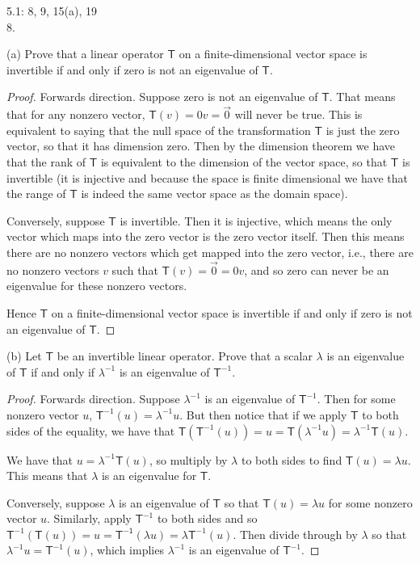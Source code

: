 \documentclass[11pt]{article}
\begin{document}
5.1: 8, 9, 15(a), 19 \\

8. 

(a) Prove that a linear operator $\mathsf{T}$ on a finite-dimensional vector space is invertible if and only if zero is not an eigenvalue of $\mathsf{T}$.

\begin{proof}
  Forwards direction. Suppose zero is not an eigenvalue of $\mathsf{T}$. That means that for any nonzero vector, $\mathsf{T}(v) = 0v = \vec{0}$ will never be true. This is equivalent to saying that the null space of the transformation $\mathsf{T}$ is just the zero vector, so that it has dimension zero. Then by the dimension theorem we have that the rank of $\mathsf{T}$ is equivalent to the dimension of the vector space, so that $\mathsf{T}$ is invertible (it is injective and because the space is finite dimensional we have that the range of $\mathsf{T}$ is indeed the same vector space as the domain space). 

  Conversely, suppose $\mathsf{T}$ is invertible. Then it is injective, which means the only vector which maps into the zero vector is the zero vector itself. Then this means there are no nonzero vectors which get mapped into the zero vector, i.e., there are no nonzero vectors $v$ such that $\mathsf{T}(v) = \vec{0} = 0v$, and so zero can never be an eigenvalue for these nonzero vectors.

  Hence $\mathsf{T}$ on a finite-dimensional vector space is invertible if and only if zero is not an eigenvalue of $\mathsf{T}$.
\end{proof}

(b) Let $\mathsf{T}$ be an invertible linear operator. Prove that a scalar $\lambda$ is an eigenvalue of $\mathsf{T}$ if and only if $\lambda^{-1}$ is an eigenvalue of $\mathsf{T}^{-1}$.

\begin{proof}
  Forwards direction. Suppose $\lambda^{-1}$ is an eigenvalue of $\mathsf{T}^{-1}$. Then for some nonzero vector $u$, $\mathsf{T}^{-1}(u) = \lambda^{-1}u$. But then notice that if we apply $\mathsf{T}$ to both sides of the equality, we have that $\mathsf{T}(\mathsf{T}^{-1}(u)) = u = \mathsf{T}(\lambda^{-1}u) = \lambda^{-1}\mathsf{T}(u)$.

  We have that $u = \lambda^{-1}\mathsf{T}(u)$, so multiply by $\lambda$ to both sides to find $\mathsf{T}(u) = \lambda u$. This means that $\lambda$ is an eigenvalue for $\mathsf{T}$.

  Conversely, suppose $\lambda$ is an eigenvalue of $\mathsf{T}$ so that $\mathsf{T}(u) = \lambda u$ for some nonzero vector $u$. Similarly, apply $\mathsf{T}^{-1}$ to both sides and so $\mathsf{T}^{-1}(\mathsf{T}(u)) = u = \mathsf{T^{-1}}(\lambda u) = \lambda \mathsf{T}^{-1}(u)$. Then divide through by $\lambda$ so that $\lambda^{-1}u = \mathsf{T}^{-1}(u)$, which implies $\lambda^{-1}$ is an eigenvalue of $\mathsf{T}^{-1}$.
\end{proof}
\end{document}
